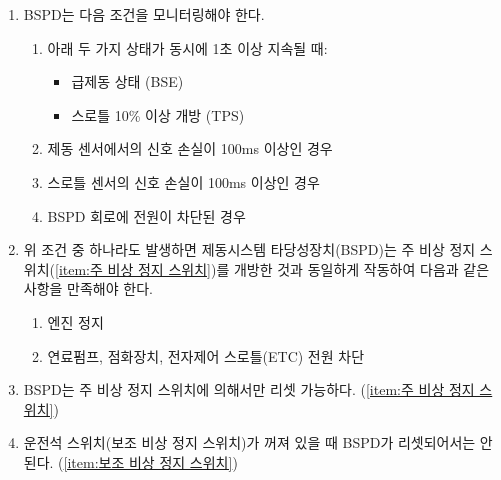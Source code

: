\documentclass[final,a4paper,10pt]{report}
\begin{document}
\begin{enumerate}
\begin{enumerate}
      \item\label{rule:formula-technical.electronic-throttle-control.bspd.monitored-conditions} BSPD는 다음 조건을 모니터링해야 한다.
        \begin{enumerate}
          \item\label{rule:formula-technical.electronic-throttle-control.bspd.monitored-conditions.brake-throttle-open-1s} 아래 두 가지 상태가 {\color{blue}동시에} 1초 이상 지속될 때:
            \begin{itemize}
              \item 급제동 상태 (BSE)
              \item 스로틀 10\% 이상 개방 (TPS)
            \end{itemize}
          \item\label{rule:formula-technical.electronic-throttle-control.bspd.monitored-conditions.brake-signal-loss-100ms} 제동 센서에서의 신호 손실이 100ms 이상인 경우
          \item\label{rule:formula-technical.electronic-throttle-control.bspd.monitored-conditions.throttle-signal-loss-100ms} 스로틀 센서의 신호 손실이 100ms 이상인 경우
          \item\label{rule:formula-technical.electronic-throttle-control.bspd.monitored-conditions.bspd-power-loss} BSPD 회로에 전원이 차단된 경우
        \end{enumerate}

      \item\label{rule:formula-technical.electronic-throttle-control.bspd.trip-mimics-estop} 위 조건 중 하나라도 발생하면 제동시스템 타당성장치(BSPD)는 주 비상 정지 스위치(\ref{item:주 비상 정지 스위치})를 개방한 것과 동일하게 작동하여 다음과 같은 사항을 만족해야 한다.
        \begin{enumerate}
          \item\label{rule:formula-technical.electronic-throttle-control.bspd.trip-mimics-estop.engine-stop} 엔진 정지
          \item\label{rule:formula-technical.electronic-throttle-control.bspd.trip-mimics-estop.fuel-ignition-throttle-cutoff} 연료펌프, 점화장치, 전자제어 스로틀(ETC) 전원 차단
        \end{enumerate}

      \item\label{rule:formula-technical.electronic-throttle-control.bspd.reset-only-via-estop} BSPD는 주 비상 정지 스위치에 의해서만 리셋 가능하다. (\ref{item:주 비상 정지 스위치})
      \item\label{rule:formula-technical.electronic-throttle-control.bspd.reset-blocked-estop-off} 운전석 스위치(보조 비상 정지 스위치)가 꺼져 있을 때 BSPD가 리셋되어서는 안 된다. (\ref{item:보조 비상 정지 스위치})


\end{enumerate}
\end{enumerate}
\end{document}
